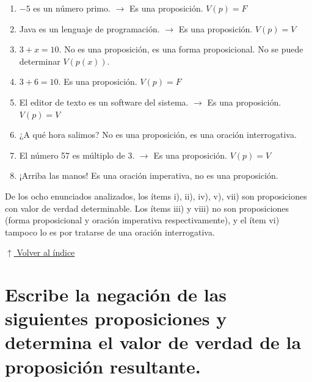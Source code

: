 \documentclass[12pt]{article}
\newcommand{\volverindice}{%
    \vspace{1em}%
    \begin{flushright}%
        \hyperlink{indice}{\small $\uparrow$ Volver al índice}%
    \end{flushright}%
}
\begin{document}
\begin{enumerate}[label=\roman*)]
    \item $-5$ es un número primo. $\rightarrow$ Es una proposición. $V(p) = F$
    \item Java es un lenguaje de programación. $\rightarrow$ Es una proposición. $V(p) = V$
    \item $3 + x = 10$. No es una proposición, es una forma proposicional. No se puede determinar $V(p(x))$.
    \item $3 + 6 = 10$. Es una proposición. $V(p) = F$
    \item El editor de texto es un software del sistema. $\rightarrow$ Es una proposición. $V(p) = V$
    \item ¿A qué hora salimos? No es una proposición, es una oración interrogativa.
    \item El número 57 es múltiplo de 3. $\rightarrow$ Es una proposición. $V(p) = V$
    \item ¡Arriba las manos! Es una oración imperativa, no es una proposición.
\end{enumerate}

De los ocho enunciados analizados, los ítems i), ii), iv), v), vii) son proposiciones con valor de verdad determinable. Los ítems iii) y viii) no son proposiciones (forma proposicional y oración imperativa respectivamente), y el ítem vi) tampoco lo es por tratarse de una oración interrogativa.

\volverindice
\newpage


\section[Negación de proposiciones]{Escribe la negación de las siguientes proposiciones y determina el valor de verdad de la proposición resultante.}
\end{document}
